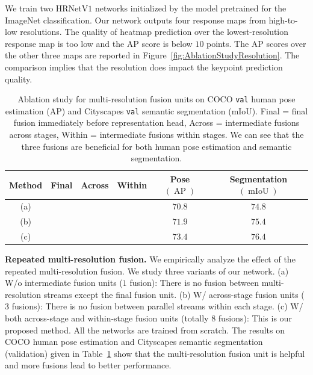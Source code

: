 \documentclass[10pt,journal,compsoc]{IEEEtran}
\begin{document}
We train two HRNetV$1$ networks initialized 
by the model pretrained for the ImageNet classification.
Our network outputs four response maps from high-to-low {resolutions}.
The quality of heatmap prediction over the lowest-resolution response map
is too low and the AP score is below $10$ points.
The AP scores over the other three maps
are reported in Figure~\ref{fig:AblationStudyResolution}.
The comparison implies that 
the resolution does impact the keypoint prediction quality.

\renewcommand{\arraystretch}{1.3}
\begin{table}[bpt]
\setlength{\tabcolsep}{5pt}
\scriptsize
\caption{Ablation study for multi-resolution fusion units
on COCO \texttt{val} human pose estimation (AP) 
and Cityscapes \texttt{val} semantic segmentation (mIoU).
Final = final fusion immediately 
before representation head,
Across = intermediate fusions across stages,
Within = intermediate fusions within stages.
{
We can see that the three fusions are beneficial
for both human pose estimation 
and semantic segmentation.}}
\label{tab:ablation_exchange_units}
\centering
\vspace{-3mm}
	\begin{tabular}{c|c|c|c|c|c}
	\hline
	Method & Final & Across & Within &  Pose $(\operatorname{AP})$ & Segmentation $ (\operatorname{mIoU})$\\
	\hline
	(a) & \checkmark &  &    & $70.8$ & $74.8$\\
	(b) & \checkmark & \checkmark &    & $71.9$ & $75.4$\\
	(c) & \checkmark & \checkmark & \checkmark    & $73.4$ & $76.4$ \\

	\hline
	\end{tabular}
	\vspace{-2mm}
\end{table}

\vspace{.1cm}
\noindent\textbf{Repeated multi-resolution fusion.}
We empirically analyze 
the effect of the repeated multi-resolution fusion.
We study three variants of our network.
(a) W/o intermediate fusion units ($1$ fusion):
There is no fusion between multi-resolution streams
except the final fusion unit.
(b) W/ across-stage fusion units ($3$ fusions):
There is no fusion between parallel streams
within each stage.
(c) W/ both across-stage and within-stage fusion units 
(totally $8$ fusions):
This is our proposed method.
All the networks
are trained from scratch.
The results on COCO human pose estimation
and Cityscapes semantic segmentation (validation) given in Table~\ref{tab:ablation_exchange_units}
show that the multi-resolution fusion unit is helpful
and more fusions lead to better performance.
\end{document}
